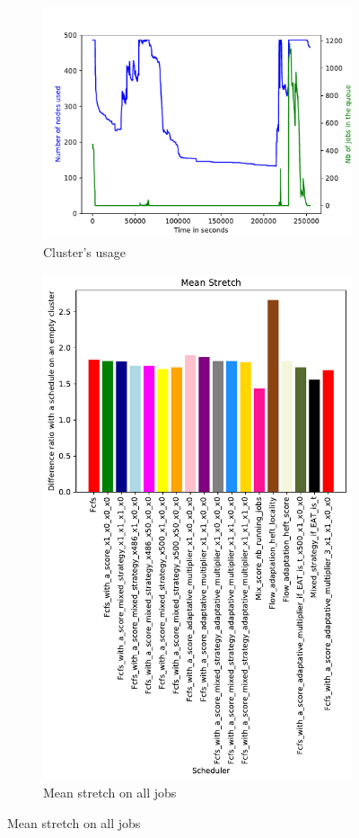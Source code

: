 \documentclass[a4paper]{article}
\begin{document}
\begin{figure}[H]\centering
\begin{subfigure}[b]{0.4\linewidth}\centering\includegraphics[width=1\linewidth]{MBSS/plot/2022-02-02->2022-02-03_V9271_Fcfs_Used_nodes_450_128_32_256_4_1024.pdf}\caption{Cluster's usage}\end{subfigure}
\begin{subfigure}[b]{0.4\linewidth}\centering\includegraphics[width=0.9\linewidth]{MBSS/plot/Results_FCFS_Score_Adaptative_Multiplier_2022-02-02->2022-02-03_V9271_Mean_Stretch_450_128_32_256_4_1024.pdf}\caption{Mean stretch on all jobs}\end{subfigure}

\end{figure}
\end{document}
